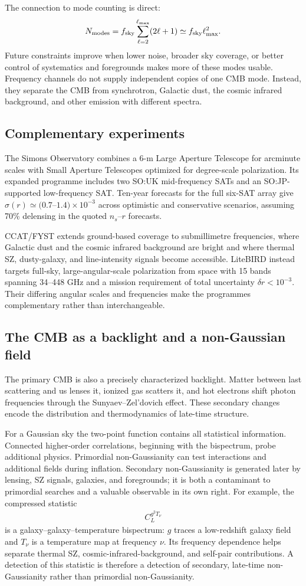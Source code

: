 \documentclass[12pt]{article}
\newcommand{\be}{\begin{eqnarray}}
\newcommand{\ee}{\end{eqnarray}}
\begin{document}
The connection to mode counting is direct:
\be
N_{\rm modes}=f_{\rm sky}\sum_{\ell=2}^{\ell_{\max}}(2\ell+1)
\simeq f_{\rm sky}\ell_{\max}^2.
\ee
Future constraints improve when lower noise, broader sky coverage, or better control
of systematics and foregrounds makes more of these modes usable. Frequency channels
do not supply independent copies of one CMB mode. Instead, they separate the CMB from
synchrotron, Galactic dust, the cosmic infrared background, and other emission with
different spectra.

\subsection{Complementary experiments}
The Simons Observatory combines a 6-m Large Aperture Telescope for arcminute scales
with Small Aperture Telescopes optimized for degree-scale polarization. Its expanded
programme includes two SO:UK mid-frequency SATs and an SO:JP-supported low-frequency
SAT. Ten-year forecasts for the full six-SAT array give
$\sigma(r)\simeq(0.7$--$1.4)\times10^{-3}$ across optimistic and conservative
scenarios, assuming 70\% delensing in the quoted $n_s$--$r$ forecasts.

CCAT/FYST extends ground-based coverage to submillimetre frequencies, where Galactic
dust and the cosmic infrared background are bright and where thermal SZ, dusty-galaxy,
and line-intensity signals become accessible. LiteBIRD instead targets full-sky,
large-angular-scale polarization from space with 15 bands spanning 34--448 GHz and a
mission requirement of total uncertainty $\delta r<10^{-3}$. Their differing angular
scales and frequencies make the programmes complementary rather than interchangeable.

\subsection{The CMB as a backlight and a non-Gaussian field}
The primary CMB is also a precisely characterized backlight. Matter between last
scattering and us lenses it, ionized gas scatters it, and hot electrons shift photon
frequencies through the Sunyaev--Zel'dovich effect. These secondary changes encode the
distribution and thermodynamics of late-time structure.

For a Gaussian sky the two-point function contains all statistical information.
Connected higher-order correlations, beginning with the bispectrum, probe additional
physics. Primordial non-Gaussianity can test interactions and additional fields during
inflation. Secondary non-Gaussianity is generated later by lensing, SZ signals,
galaxies, and foregrounds; it is both a contaminant to primordial searches and a
valuable observable in its own right. For example, the compressed statistic
\be
C_L^{g^2T_\nu}
\ee
is a galaxy--galaxy--temperature bispectrum: $g$ traces a low-redshift galaxy field
and $T_\nu$ is a temperature map at frequency $\nu$. Its frequency dependence helps
separate thermal SZ, cosmic-infrared-background, and self-pair contributions. A
detection of this statistic is therefore a detection of secondary, late-time
non-Gaussianity rather than primordial non-Gaussianity.
\end{document}
